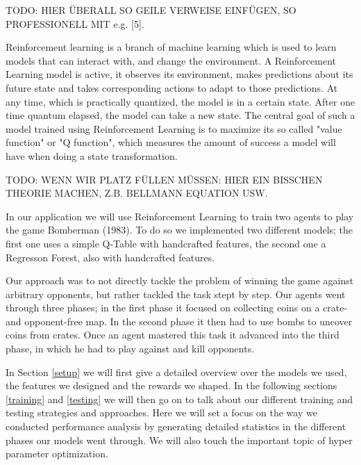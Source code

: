 TODO: HIER ÜBERALL SO GEILE VERWEISE EINFÜGEN, SO PROFESSIONELL MIT e.g. [5].\newline

Reinforcement learning is a branch of machine learning which is used to learn models that can interact with, and change the environment. A Reinforcement Learning model is active, it observes its environment, makes predictions about its future state and takes corresponding actions to adapt to those predictions. At any time, which is practically quantized, the model is in a certain state. After one time quantum elapsed, the model can take a new state. The central goal of such a model trained using Reinforcement Learning is to maximize its so called "value function" or "Q function", which measures the amount of success a model will have when doing a state transformation.\newline\newline

TODO: WENN WIR PLATZ FÜLLEN MÜSSEN: HIER EIN BISSCHEN THEORIE MACHEN, Z.B. BELLMANN EQUATION USW.

In our application we will use Reinforcement Learning to train two agents to play the game Bomberman (1983). To do so we implemented two different models; the first one uses a simple Q-Table with handcrafted features, the second one a Regresson Forest, also with handcrafted features.\newline

Our approach was to not directly tackle the problem of winning the game against arbitrary opponents, but rather tackled the task stept by step. Our agents went through three phases; in the first phase it focused on collecting coins on a crate- and opponent-free map. In the second phase it then had to use bombs to uncover coins from crates. Once an agent mastered this task it advanced into the third phase, in which he had to play against and kill opponents.\newline

In Section \ref{setup} we will first give a detailed overview over the models we used, the features we designed and the rewards we shaped. In the following sections \ref{training} and \ref{testing} we will then go on to talk about our different training and testing strategies and approaches. Here we will set a focus on the way we conducted performance analysis by generating detailed statistics in the different phases our models went through. We will also touch the important topic of hyper parameter optimization.